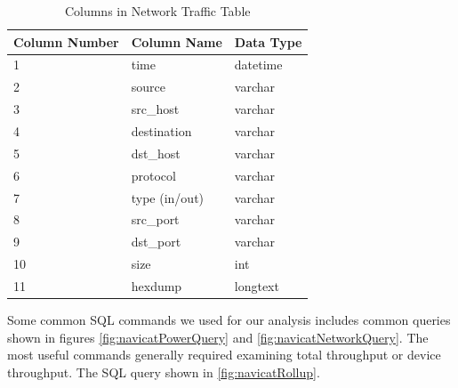 \begin{table}[H]
    \centering
    \caption{Columns in Network Traffic Table}
    \begin{tabular}{@{}lll@{}}
    \toprule
    Column Number & Column Name & Data Type \\ \midrule
    1             & time        & datetime  \\
    2             & source      & varchar   \\
    3             & src\_host   & varchar   \\
    4             & destination & varchar   \\
    5             & dst\_host   & varchar   \\
    6             & protocol    & varchar   \\
    7             & type (in/out)       & varchar   \\
    8             & src\_port   & varchar   \\
    9             & dst\_port   & varchar   \\
    10            & size        & int       \\
    11            & hexdump     & longtext  \\ \bottomrule
    \end{tabular}
    \label{tab:netcol}
    \end{table}

Some common SQL commands we used for our analysis includes common queries shown in figures \ref{fig:navicatPowerQuery} and \ref{fig:navicatNetworkQuery}. The most useful commands generally required examining total throughput or device throughput. The SQL query shown in \ref{fig:navicatRollup}.

